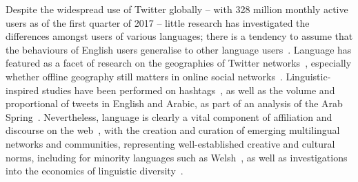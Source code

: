 \documentclass{llncs}
\begin{document}
%


Despite the widespread use of Twitter globally -- with 328 million
monthly active users as of the first quarter of 2017 -- little
research has investigated the differences amongst users of various
languages; there is a tendency to assume that the behaviours of
English users generalise to other language
users~\cite{hong-et-al:2011}. Language has featured as a facet of
research on the geographies of Twitter
networks~\cite{takhteyev-et-al:2012}, especially whether offline
geography still matters in online social
networks~\cite{kulshrestha-et-al:2012}. Linguistic-inspired studies
have been performed on hashtags~\cite{cunha-et-al:2011}, as well as
the volume and proportional of tweets in English and Arabic, as part
of an analysis of the Arab
Spring~\cite{bruns-et-al:2013}. Nevertheless, language is clearly a
vital component of affiliation and discourse on the
web~\cite{zappavigna+martin:2012}, with the creation and curation of
emerging multilingual networks and communities, representing
well-established creative and cultural norms, including for minority
languages such as Welsh~\cite{gj+uj:2013}, as well as investigations
into the economics of linguistic
diversity~\cite{ginsburgh+weber:2011}.
\end{document}
